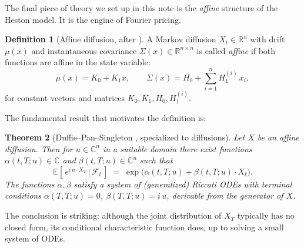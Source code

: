 \documentclass[11pt]{article}
\theoremstyle{plain}
\newtheorem{theorem}{Theorem}[section]
\theoremstyle{definition}
\newtheorem{definition}[theorem]{Definition}
\theoremstyle{remark}
\begin{document}
The final piece of theory we set up in this note is the \emph{affine} structure of the Heston model. It is the engine of Fourier pricing.

\begin{definition}[Affine diffusion, after \cite{DPS2000}]
    A Markov diffusion \(X_t \in \mathbb{R}^n\) with drift \(\mu(x)\) and instantaneous covariance \(\Sigma(x) \in \mathbb{R}^{n \times n}\) is called \emph{affine} if both functions are affine in the state variable:
    \[
        \mu(x) = K_0 + K_1 x, \qquad \Sigma(x) = H_0 + \sum_{i=1}^{n} H_1^{(i)}\,x_i,
    \]
    for constant vectors and matrices \(K_0, K_1, H_0, H_1^{(i)}\).
\end{definition}

The fundamental result that motivates the definition is:

\begin{theorem}[Duffie--Pan--Singleton \cite{DPS2000}, specialized to diffusions]\label{thm:DPS}
    Let \(X\) be an affine diffusion. Then for \(u \in \mathbb{C}^n\) in a suitable domain there exist functions \(\alpha(t, T; u) \in \mathbb{C}\) and \(\beta(t, T; u) \in \mathbb{C}^n\) such that
    \[
        \mathbb{E}\!\left[\,e^{i\,u\cdot X_T}\,\Big|\,\mathcal{F}_t\,\right] \;=\; \exp\!\bigl(\alpha(t, T; u) + \beta(t, T; u)\cdot X_t\bigr).
    \]
    The functions \(\alpha, \beta\) satisfy a system of (generalized) Riccati ODEs with terminal conditions \(\alpha(T, T; u) = 0\), \(\beta(T, T; u) = i\,u\), derivable from the generator of \(X\).
\end{theorem}

The conclusion is striking: although the joint distribution of \(X_T\) typically has no closed form, its conditional characteristic function does, up to solving a small system of ODEs.
\end{document}
